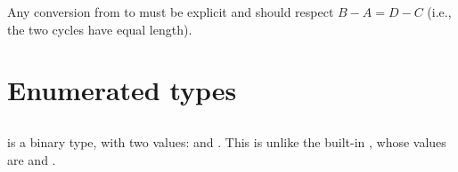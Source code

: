 Any conversion from  to
 must be explicit and should
respect $B - A = D - C$ (i.e., the
two cycles have equal length).


\section{Enumerated types}

\subsection{}

 is a binary type, with two values: 
and .  This is unlike the built-in , whose
values are  and .

\subsection{}

